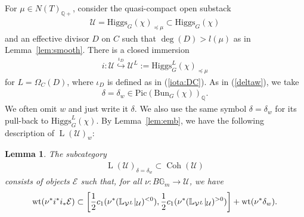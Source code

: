 \documentclass [11pt,oneside,a4paper,mathscr]{amsart}
\newtheorem{lemma}[thm]{Lemma}
\theoremstyle{definition}
\newcommand{\U}{\mathcal{U}}
\newcommand{\V}{\mathcal{V}}
\newcommand{\LL}{\operatorname{L}}
\newcommand{\bgm}{B\mathbb{G}_m}
\newcommand{\Coh}{\operatorname{Coh}}
\newcommand{\wt}{\mathrm{wt}}
\newcommand{\Hig}{\mathrm{Higgs}}
\newcommand{\Bun}{\mathrm{Bun}}
\begin{document}
For $\mu \in N(T)_{\mathbb{Q}+}$, consider the quasi-compact open substack 
\begin{align}\label{stack:U}
\mathcal{U} =\Hig_G(\chi)_{\preceq \mu}
\subset \Hig_G(\chi)
\end{align}
and 
an effective divisor $D$ on $C$ such that 
$\deg (D)>l(\mu)$ as in Lemma~\ref{lem:smooth}.
There is a closed immersion 
\begin{align}\label{emb:jU}
i \colon \mathcal{U} \stackrel{\iota_D}{\hookrightarrow} 
    \mathcal{U}^L:=\Hig^L_G(\chi)_{\preceq \mu}
\end{align}
for $L=\Omega_C(D)$, where $\iota_D$ is defined as in (\ref{iota:DC}).
As in (\ref{deltaw}), we take 
\begin{align*}
    \delta=\delta_w \in \mathrm{Pic}(\Bun_G(\chi))_{\mathbb{Q}}.
\end{align*}
We often omit $w$ and just write it $\delta$. 
We also use the same symbol $\delta=\delta_w$ for its pull-back to 
$\Hig^L_G(\chi)$. 
By Lemma~\ref{lem:emb}, we have the following description of $\LL(\mathcal{U})_{w}$: 


\begin{lemma}\label{defn:QB}
The subcategory
\begin{align}\label{def:QBH}
\LL(\mathcal{U})_{\delta=\delta_w} \subset \Coh(\mathcal{U})
\end{align}
consists of objects $\mathcal{E}$ such that, for all $\nu \colon \bgm \to \mathcal{U}$,
we have 
\begin{align}\notag
\wt(\nu^{\ast}i^{\ast}i_{\ast}\mathcal{E}) \subset 
\left[\frac{1}{2}c_1(\nu^{\ast}(\mathbb{L}_{\V^L}|_{\U})^{<0}), 
\frac{1}{2}c_1(\nu^{\ast}(\mathbb{L}_{\V^L}|_{\U})^{>0}) \right]
    +\wt(\nu^{\ast}\delta_w). 
\end{align}
\end{lemma}
\end{document}
